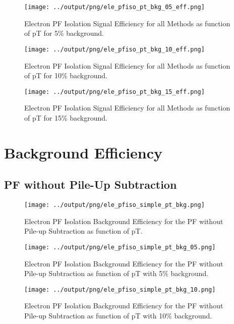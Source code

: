 \documentclass[11pt]{book}
\begin{document}
\begin{figure}[htb]
\centering
\texttt{[image: ../output/png/ele\_pfiso\_pt\_bkg\_05\_eff.png]}
\caption{Electron PF Isolation Signal Efficiency for all Methods as function of pT for 5\% background.}
\label{fig:ele_pfiso_pt_bkg_05_eff}
\end{figure}

\begin{figure}[htb]
\centering
\texttt{[image: ../output/png/ele\_pfiso\_pt\_bkg\_10\_eff.png]}
\caption{Electron PF Isolation Signal Efficiency for all Methods as function of pT for 10\% background.}
\label{fig:ele_pfiso_pt_bkg_10_eff}
\end{figure}

\begin{figure}[htb]
\centering
\texttt{[image: ../output/png/ele\_pfiso\_pt\_bkg\_15\_eff.png]}
\caption{Electron PF Isolation Signal Efficiency for all Methods as function of pT for 15\% background.}
\label{fig:ele_pfiso_pt_bkg_15_eff}
\end{figure}
\clearpage

\chapter{Background Efficiency}
\section{PF without Pile-Up Subtraction}
\begin{figure}[htb]
\centering
\texttt{[image: ../output/png/ele\_pfiso\_simple\_pt\_bkg.png]}
\caption{Electron PF Isolation Background Efficiency for the PF without Pile-up Subtraction as function of pT.}
\label{fig:ele_pfiso_pt_bkg_simple}
\end{figure}

\begin{figure}[htb]
\centering
\texttt{[image: ../output/png/ele\_pfiso\_simple\_pt\_bkg\_05.png]}
\caption{Electron PF Isolation Background Efficiency for the PF without Pile-up Subtraction as function of pT with 5\% background.}
\label{fig:ele_pfiso_pt_bkg_simple_bkg_05}
\end{figure}

\begin{figure}[htb]
\centering
\texttt{[image: ../output/png/ele\_pfiso\_simple\_pt\_bkg\_10.png]}
\caption{Electron PF Isolation Background Efficiency for the PF without Pile-up Subtraction as function of pT with 10\% background.}
\label{fig:ele_pfiso_pt_bkg_simple_bkg_10}
\end{figure}
\end{document}
